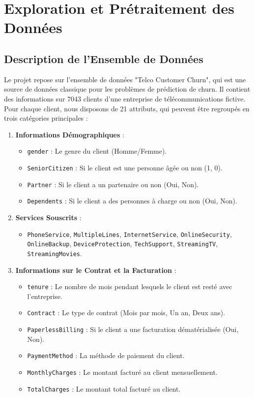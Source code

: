 \chapter{Exploration et Prétraitement des Données}

\section{Description de l'Ensemble de Données}
Le projet repose sur l'ensemble de données "Telco Customer Churn", qui est une source de données classique pour les problèmes de prédiction de churn. Il contient des informations sur 7043 clients d'une entreprise de télécommunications fictive. Pour chaque client, nous disposons de 21 attributs, qui peuvent être regroupés en trois catégories principales :

\begin{enumerate}
    \item \textbf{Informations Démographiques} :
    \begin{itemize}
        \item \texttt{gender} : Le genre du client (Homme/Femme).
        \item \texttt{SeniorCitizen} : Si le client est une personne âgée ou non (1, 0).
        \item \texttt{Partner} : Si le client a un partenaire ou non (Oui, Non).
        \item \texttt{Dependents} : Si le client a des personnes à charge ou non (Oui, Non).
    \end{itemize}

    \item \textbf{Services Souscrits} :
    \begin{itemize}
        \item \texttt{PhoneService}, \texttt{MultipleLines}, \texttt{InternetService}, \texttt{OnlineSecurity}, \texttt{OnlineBackup}, \texttt{DeviceProtection}, \texttt{TechSupport}, \texttt{StreamingTV}, \texttt{StreamingMovies}.
    \end{itemize}

    \item \textbf{Informations sur le Contrat et la Facturation} :
    \begin{itemize}
        \item \texttt{tenure} : Le nombre de mois pendant lesquels le client est resté avec l'entreprise.
        \item \texttt{Contract} : Le type de contrat (Mois par mois, Un an, Deux ans).
        \item \texttt{PaperlessBilling} : Si le client a une facturation dématérialisée (Oui, Non).
        \item \texttt{PaymentMethod} : La méthode de paiement du client.
        \item \texttt{MonthlyCharges} : Le montant facturé au client mensuellement.
        \item \texttt{TotalCharges} : Le montant total facturé au client.
    \end{itemize}
\end{enumerate}

